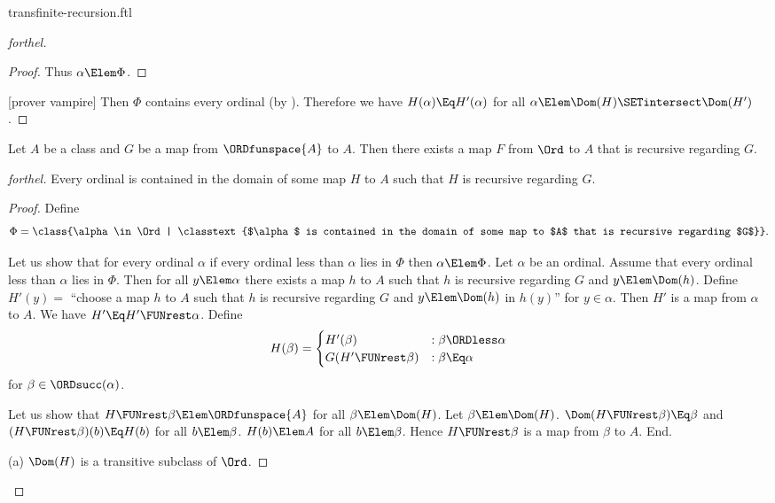 \documentclass{stex}
\begin{document}
\begin{smodule}{transfinite-recursion.ftl}
\begin{proof}[forthel]
\begin{proof}
    Thus $\alpha \Elem \Phi$.
  \end{proof}

  [prover vampire]
  Then $\Phi$ contains every ordinal (by ).
  Therefore we have $H(\alpha) \Eq H'(\alpha)$ for all $\alpha \Elem \Dom(H) \SETintersect \Dom(H')$.
\end{proof}

\begin{theorem}[forthel,title=Transfinite Recursion Theorem: Existence,id=transfinite_recursion_existence]
  Let $A$ be a class and $G$ be a map from $\ORDfunspace{A}$ to $A$.
  Then there exists a map $F$ from $\Ord$ to $A$ that is recursive regarding $G$.
\end{theorem}
\begin{proof}[forthel]
  Every ordinal is contained in the domain of some map $H$ to $A$ such that $H$ is recursive regarding $G$.
  \begin{proof}
    Define \[ \Phi = \class{\alpha \in \Ord | \classtext{$\alpha$ is contained in the domain of some map to $A$ that is recursive regarding $G$}}. \]

    Let us show that for every ordinal $\alpha$ if every ordinal less than $\alpha$ lies in $\Phi$ then $\alpha \Elem \Phi$.
      Let $\alpha$ be an ordinal.
      Assume that every ordinal less than $\alpha$ lies in $\Phi$.
      Then for all $y \Elem \alpha$ there exists a map $h$ to $A$ such that $h$ is recursive regarding $G$ and $y \Elem \Dom(h)$.
      Define $H'(y) =$ ``choose a map $h$ to $A$ such that $h$ is recursive regarding $G$ and $y \Elem \Dom(h)$ in $h(y)$'' for $y \in \alpha$.
      Then $H'$ is a map from $\alpha$ to $A$.
      We have $H' \Eq H' \FUNrest \alpha$.
      Define \[ H(\beta) =
        \begin{cases}
          H'(\beta)                 & : \beta \ORDless \alpha \\
          G(H' \FUNrest \beta)  & : \beta \Eq \alpha
        \end{cases} \]
      for $\beta \in \ORDsucc(\alpha)$.
      
      Let us show that $H \FUNrest \beta \Elem \ORDfunspace{A}$ for all $\beta \Elem \Dom(H)$.
        Let $\beta \Elem \Dom(H)$.
        $\Dom(H \FUNrest \beta) \Eq \beta$ and $(H \FUNrest \beta)(b) \Eq H(b)$ for all $b \Elem \beta$.
        $H(b) \Elem A$ for all $b \Elem \beta$.
        Hence $H \FUNrest \beta$ is a map from $\beta$ to $A$.
      End.

      (a) $\Dom(H)$ is a transitive subclass of $\Ord$.


\end{proof}
\end{proof}
\end{smodule}
\end{document}
